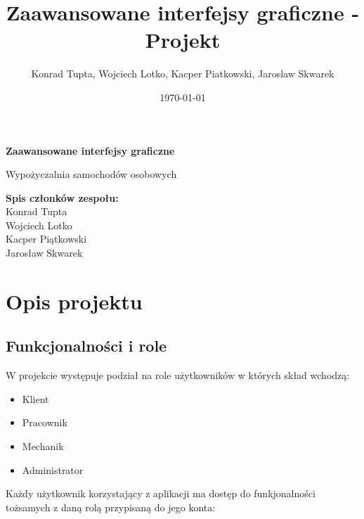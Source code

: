 \documentclass{article}
\title{Zaawansowane interfejsy graficzne - Projekt}
\author{Konrad Tupta, Wojciech Lotko, Kacper Piatkowski, Jaroslaw Skwarek}
\date{\today}
\begin{document}
    
\begin{titlepage}
    \centering
    \vspace*{1in}
    \Huge
    \textbf{Zaawansowane interfejsy graficzne}
    
    \vspace{0.5in}
    \LARGE
    Wypożyczalnia samochodów osobowych 
    
    \vfill
    \Large
    \textbf{Spis członków zespołu:}\\
    Konrad Tupta\\
    Wojciech Lotko\\
    Kacper Piątkowski\\
    Jarosław Skwarek\\
\end{titlepage}

\section{Opis projektu}

\subsection{Funkcjonalności i role}
W projekcie występuje podział na role użytkowników w których skład wchodzą:

\begin{itemize}
    \item Klient
    \item Pracownik
    \item Mechanik
    \item Administrator
\end{itemize}

Każdy użytkownik korzystający z aplikacji ma dostęp do funkjonalności tożsamych z daną rolą przypisaną do jego konta:
\end{document}
